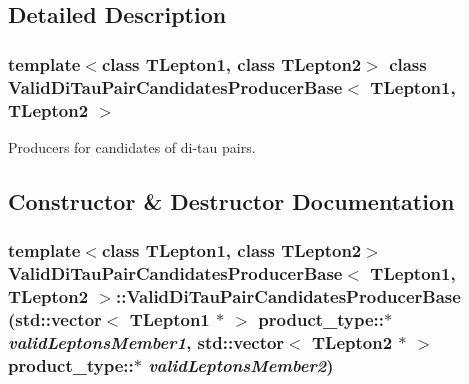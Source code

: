 \subsection{Detailed Description}
\subsubsection*{template$<$class TLepton1, class TLepton2$>$ class ValidDiTauPairCandidatesProducerBase$<$ TLepton1, TLepton2 $>$}

Producers for candidates of di-\/tau pairs. 

\subsection{Constructor \& Destructor Documentation}
\hypertarget{classValidDiTauPairCandidatesProducerBase_ab262ca6b1bfefa6899542a50c0bf008e}{
\subsubsection[{ValidDiTauPairCandidatesProducerBase}]{\setlength{\rightskip}{0pt plus 5cm}template$<$class TLepton1, class TLepton2$>$ {\bf ValidDiTauPairCandidatesProducerBase}$<$ TLepton1, TLepton2 $>$::{\bf ValidDiTauPairCandidatesProducerBase} (std::vector$<$ TLepton1 $\ast$ $>$ product\_\-type::$\ast$ {\em validLeptonsMember1}, \/  std::vector$<$ TLepton2 $\ast$ $>$ product\_\-type::$\ast$ {\em validLeptonsMember2})}}
\label{classValidDiTauPairCandidatesProducerBase_ab262ca6b1bfefa6899542a50c0bf008e}


